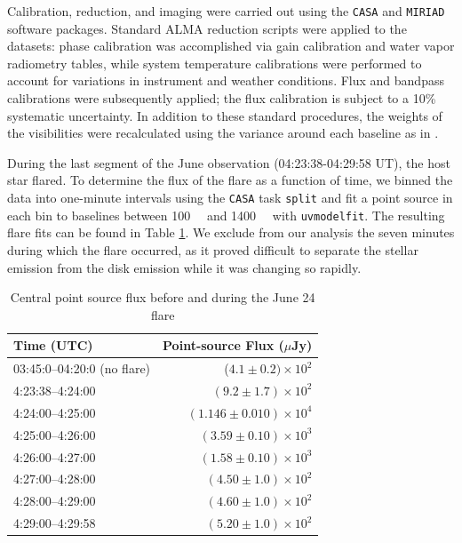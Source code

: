 \documentclass[modern]{aastex62}
\begin{document}
Calibration, reduction, and imaging were carried out using the \texttt{CASA} \citep{mcmullin07} and \texttt{MIRIAD} \citep{sault95} software packages. 
Standard ALMA reduction scripts were applied to the datasets: phase calibration was accomplished via gain calibration and water vapor radiometry tables, while system temperature calibrations were performed to account for variations in instrument and weather conditions. 
Flux and bandpass calibrations were subsequently applied; the flux calibration is subject to a 10\% systematic uncertainty.
In addition to these standard procedures, the weights of the visibilities were recalculated using the variance around each baseline as in \cite{flaherty17}.


During the last segment of the June observation (04:23:38-04:29:58 UT), the host star flared. 
To determine the flux of the flare as a function of time, we binned the data into one-minute intervals using the \texttt{CASA} task \texttt{split} and fit a point source in each bin to baselines between \SI{100}{\kilo \lambda} and \SI{1400}{\kilo \lambda} with \texttt{uvmodelfit}. 
The resulting flare fits can be found in Table \ref{tab:flare fluxes}. 
We exclude from our analysis the seven minutes during which the flare occurred, as it proved difficult to separate the stellar emission from the disk emission while it was changing so rapidly.

\begin{table}	
  \centering
  \begin{tabular}{lr}
    \toprule
    Time (UTC) & Point-source Flux ($\mu$Jy) \\
    \midrule
    03:45:0--04:20:0 (no flare) & ($4.1 \pm 0.2)  \times 10^2$\\
  	4:23:38--4:24:00 & $(9.2 \pm 1.7) \times 10^2$ \\
  	4:24:00--4:25:00 & $(1.146 \pm 0.010) \times 10^4$ \\
  	4:25:00--4:26:00 & $(3.59 \pm 0.10) \times 10^3$ \\
  	4:26:00--4:27:00 & $(1.58 \pm 0.10) \times 10^3$ \\
  	4:27:00--4:28:00 & $(4.50 \pm 1.0) \times 10^2$ \\
  	4:28:00--4:29:00 & $(4.60 \pm 1.0) \times 10^2$ \\
  	4:29:00--4:29:58 & $(5.20 \pm 1.0) \times 10^2$\\
    \bottomrule
  \end{tabular}
	\caption{Central point source flux before and during the June 24 flare}
  \label{tab:flare fluxes}
\end{table}
\end{document}

